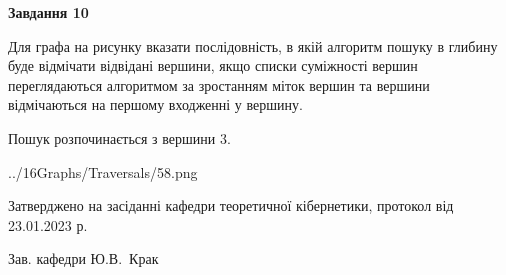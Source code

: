 \documentclass[12pt, ukrainian]{article}
\begin{document}
{\begin {large}
{\begin {center}\textbf{Завдання 10}\end {center}}\par
Для графа на рисунку вказати послідовність, в якій алгоритм пошуку в глибину буде відмічати відвідані вершини, якщо списки суміжності вершин переглядаються алгоритмом за зростанням міток вершин та вершини відмічаються на першому вход\-женні у вершину.\par
Пошук розпочинається з вершини 3.\par

\begin{center}
	{../16Graphs/Traversals/58.png}
\end{center}\par
\newpage


\end {large}
}
{\smallskip \begin {small} Затверджено на засіданні кафедри теоретичної кібернетики, протокол  від   23.01.2023 р.\par\smallskip\smallskip
{\parbox {6.5 cm}{Зав. кафедри \dotfill Ю.В.~Крак}} \end{small}}
\end{document}

